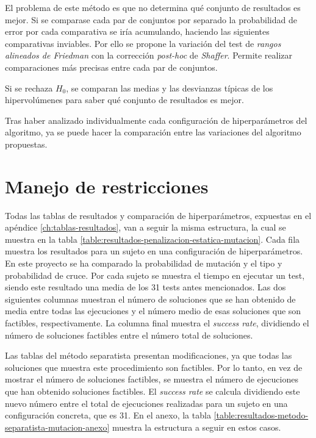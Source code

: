 El problema de este método es que no determina qué conjunto de resultados es mejor. Si se comparase cada par de conjuntos por separado la probabilidad de error por cada comparativa se iría acumulando, haciendo las siguientes comparativas inviables. Por ello se propone la variación del test de \textit{rangos alineados de Friedman} con la corrección \textit{post-hoc} de \textit{Shaffer}. Permite realizar comparaciones más precisas entre cada par de conjuntos.~\cite{stac2024shaffer}

Si se rechaza \(H_0\), se comparan las medias y las desvianzas típicas de los hipervolúmenes para saber qué conjunto de resultados es mejor.

Tras haber analizado individualmente cada configuración de hiperparámetros del algoritmo, ya se puede hacer la comparación entre las variaciones del algoritmo propuestas.

\section{Manejo de restricciones}
\label{ch:manejo-restricciones-experimentacion}

Todas las tablas de resultados y comparación de hiperparámetros, expuestas en el apéndice \ref{ch:tablas-resultados}, van a seguir la misma estructura, la cual se muestra en la tabla \ref{table:resultados-penalizacion-estatica-mutacion}. Cada fila muestra los resultados para un sujeto en una configuración de hiperparámetros. En este proyecto se ha comparado la probabilidad de mutación y el tipo y probabilidad de cruce. Por cada sujeto se muestra el tiempo en ejecutar un test, siendo este resultado una media de los 31 tests antes mencionados. Las dos siguientes columnas muestran el número de soluciones que se han obtenido de media entre todas las ejecuciones y el número medio de esas soluciones que son factibles, respectivamente. La columna final muestra el \textit{success rate}, dividiendo el número de soluciones factibles entre el número total de soluciones.

Las tablas del método separatista presentan modificaciones, ya que todas las soluciones que muestra este procedimiento son factibles. Por lo tanto, en vez de mostrar el número de soluciones factibles, se muestra el número de ejecuciones que han obtenido soluciones factibles. El \textit{success rate} se calcula dividiendo este nuevo número entre el total de ejecuciones realizadas para un sujeto en una configuración concreta, que es 31. En el anexo, la tabla \ref{table:resultados-metodo-separatista-mutacion-anexo} muestra la estructura a seguir en estos casos.

